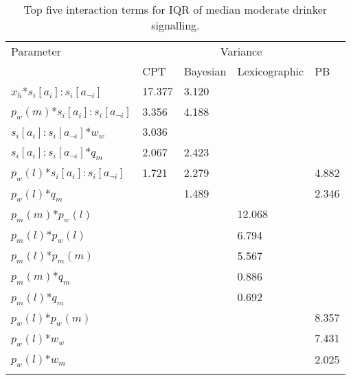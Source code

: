 \begin{table}[H]
\caption{Top five interaction terms for IQR of median moderate drinker signalling. \label{tab:sa_interaction_prospect_sig_iqr}}
\begin{tabular} {lllll}
\hline\noalign{\smallskip}
Parameter & \multicolumn{4}{c}{Variance} \\ 
& \ac{CPT} & Bayesian & Lexicographic & \ac{PB} \\
\noalign{\smallskip}\svhline\noalign{\smallskip}

\(x_{h}\)*\(s_{i}[a_{i}]:s_{i}[a_{\neg i}]\) & 17.377 & 3.120\\
\(p_{w}(m)\)*\(s_{i}[a_{i}]:s_{i}[a_{\neg i}]\) & 3.356 & 4.188\\
\(s_{i}[a_{i}]:s_{i}[a_{\neg i}]\)*\(w_{w}\) & 3.036\\
\(s_{i}[a_{i}]:s_{i}[a_{\neg i}]\)*\(q_{m}\) & 2.067 & 2.423\\
\(p_{w}(l)\)*\(s_{i}[a_{i}]:s_{i}[a_{\neg i}]\) & 1.721 & 2.279 && 4.882\\


\(p_{w}(l)\)*\(q_{m}\) && 1.489 && 2.346\\

\(p_{m}(m)\)*\(p_{w}(l)\) &&& 12.068\\
\(p_{m}(l)\)*\(p_{w}(l)\) &&& 6.794\\
\(p_{m}(l)\)*\(p_{m}(m)\) &&& 5.567\\
\(p_{m}(m)\)*\(q_{m}\) &&& 0.886\\
\(p_{m}(l)\)*\(q_{m}\) &&& 0.692\\

\(p_{w}(l)\)*\(p_{w}(m)\) &&&& 8.357\\
\(p_{w}(l)\)*\(w_{w}\) &&&& 7.431\\
\(p_{w}(l)\)*\(w_{m}\) &&&& 2.025\\ 
\noalign{\smallskip}\hline\noalign{\smallskip}
\end{tabular}
\end{table}

